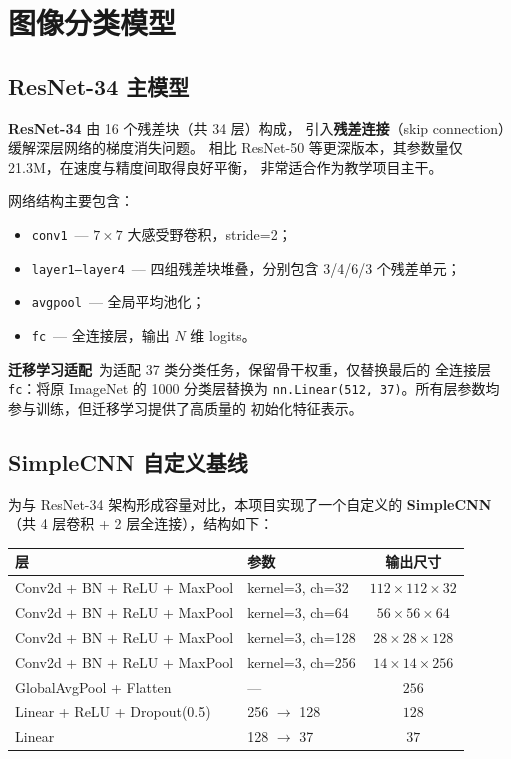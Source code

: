 \documentclass[12pt, a4paper, openany]{ctexbook}
\begin{document}
\section{图像分类模型}

\subsection{ResNet-34 主模型}

\textbf{ResNet-34}\cite{he2016resnet} 由 16 个残差块（共 34 层）构成，
引入\textbf{残差连接}（skip connection）缓解深层网络的梯度消失问题。
相比 ResNet-50 等更深版本，其参数量仅 21.3M，在速度与精度间取得良好平衡，
非常适合作为教学项目主干。

网络结构主要包含：

\begin{itemize}[leftmargin=*]
  \item \texttt{conv1}\ — $7 \times 7$ 大感受野卷积，stride=2；
  \item \texttt{layer1--layer4}\ — 四组残差块堆叠，分别包含 3/4/6/3 个残差单元；
  \item \texttt{avgpool}\ — 全局平均池化；
  \item \texttt{fc}\ — 全连接层，输出 $N$ 维 logits。
\end{itemize}

\textbf{迁移学习适配}\ 为适配 37 类分类任务，保留骨干权重，仅替换最后的
全连接层 \texttt{fc}：将原 ImageNet 的 1000 分类层替换为
\texttt{nn.Linear(512, 37)}。所有层参数均参与训练，但迁移学习提供了高质量的
初始化特征表示。

\subsection{SimpleCNN 自定义基线}

为与 ResNet-34 架构形成容量对比，本项目实现了一个自定义的
\textbf{SimpleCNN}（共 4 层卷积 + 2 层全连接），结构如下：

\begin{center}
\begin{tabular}{llc}
  \toprule
  \textbf{层} & \textbf{参数} & \textbf{输出尺寸} \\
  \midrule
  Conv2d + BN + ReLU + MaxPool & kernel=3, ch=32  & $112 \times 112 \times 32$ \\
  Conv2d + BN + ReLU + MaxPool & kernel=3, ch=64  & $56 \times 56 \times 64$ \\
  Conv2d + BN + ReLU + MaxPool & kernel=3, ch=128 & $28 \times 28 \times 128$ \\
  Conv2d + BN + ReLU + MaxPool & kernel=3, ch=256 & $14 \times 14 \times 256$ \\
  GlobalAvgPool + Flatten      & ---              & $256$ \\
  Linear + ReLU + Dropout(0.5) & 256 $\to$ 128    & $128$ \\
  Linear                       & 128 $\to$ 37     & $37$ \\
  \bottomrule
\end{tabular}
\end{center}
\end{document}
